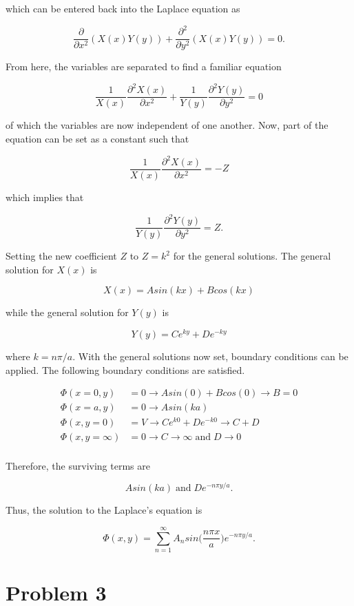 \documentclass[11pt]{article}
\begin{document}
which can be entered back into the Laplace equation as

$$
\frac{\partial }{\partial x^{2}} (X(x)Y(y))+ \frac{\partial^{2}}{\partial y^{2}} (X(x)Y(y))= 0.
$$

From here, the variables are separated to find a familiar equation

$$
\frac{1}{X(x)}\frac{\partial^{2} X(x)}{\partial x^{2}} + \frac{1}{Y(y)}\frac{\partial^{2} Y(y)}{\partial y^{2}} = 0
$$

of which the variables are now independent of one another. Now, part of the equation can be set as a constant such that

$$
\frac{1}{X(x)}\frac{\partial^{2} X(x)}{\partial x^{2}} = -Z
$$

which implies that

$$
\frac{1}{Y(y)}\frac{\partial^{2} Y(y)}{\partial y^{2}} = Z.
$$

Setting the new coefficient $Z$ to $Z = k^{2}$ for the general solutions. The general solution for $X(x)$ is

$$
X(x) = Asin(kx) + Bcos(kx)
$$

while the general solution for $Y(y)$ is

$$
Y(y) = Ce^{ky} + De^{-ky}
$$

where $k = n\pi/a$. With the general solutions now set, boundary conditions can be applied. The following boundary conditions are satisfied. 

\begin{align*}
    \Phi(x = 0, y) &= 0 \rightarrow Asin(0) + Bcos(0) \rightarrow B = 0\\  
    \Phi(x = a, y) &= 0 \rightarrow Asin(ka) \\
    \Phi(x, y = 0) &= V \rightarrow Ce^{k0} + De^{-k0 }  \rightarrow C + D\\
    \Phi(x, y = \infty) &= 0 \rightarrow C \rightarrow \infty \; \text{and} \; D \rightarrow 0\\
\end{align*}

Therefore, the surviving terms are

$$
Asin(ka) \; \text{and} \; De^{-n\pi y/a}.
$$


Thus, the solution to the Laplace's equation is 

$$
\Phi(x, y) = \sum_{n = 1}^{\infty} A_{n}sin\Big(\frac{n\pi x}{a}\Big) e^{-n\pi y/a}.
$$

\clearpage

\section*{Problem 3}
\end{document}
